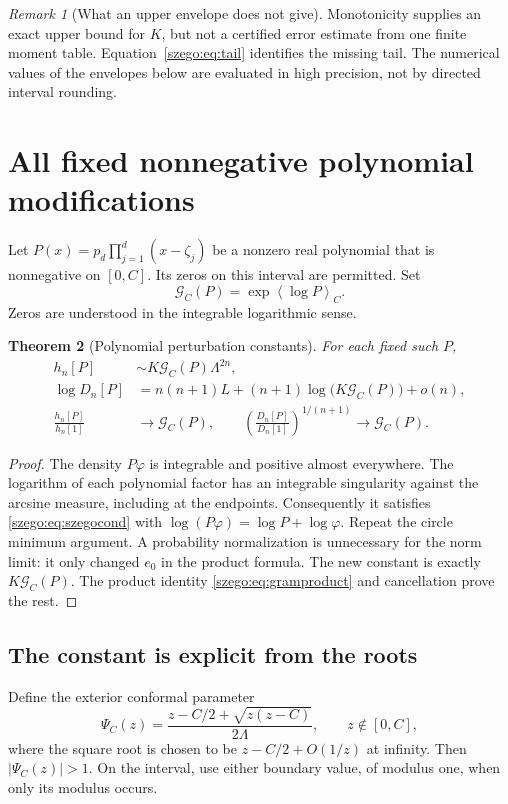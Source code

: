 \documentclass[11pt,a4paper]{article}
\numberwithin{equation}{section}
\newtheorem{theorem}{Theorem}[section]
\theoremstyle{remark}\newtheorem{remark}[theorem]{Remark}
\newcommand{\Lam}{\Lambda}
\newcommand{\mean}[1]{\left\langle#1\right\rangle}
\begin{document}
\begin{remark}[What an upper envelope does not give]
Monotonicity supplies an exact upper bound for $K$, but not a certified
error estimate from one finite moment table. Equation~\eqref{szego:eq:tail}
identifies the missing tail. The numerical values of the envelopes below
are evaluated in high precision, not by directed interval rounding.
\end{remark}

\section{All fixed nonnegative polynomial modifications}
\label{szego:sec:polynomials}
Let $P(x)=p_d\prod_{j=1}^d(x-\zeta_j)$ be a nonzero real polynomial that is
nonnegative on $[0,C]$. Its zeros on this interval are permitted.
Set
\begin{equation}\label{szego:eq:GP}
 \mathcal G_C(P)=\exp\mean{\log P}_C.
\end{equation}
Zeros are understood in the integrable logarithmic sense.

\begin{theorem}[Polynomial perturbation constants]\label{szego:thm:polynomial}
For each fixed such $P$,
\begin{align}
 h_n[P]&\sim K\mathcal G_C(P)\Lam^{2n},\label{szego:eq:polyh}\\
 \log D_n[P]&=n(n+1)L+(n+1)\log\bigl(K\mathcal G_C(P)\bigr)+o(n),\label{szego:eq:polyD}\\
 \frac{h_n[P]}{h_n[1]}&\longrightarrow\mathcal G_C(P),\qquad
 \left(\frac{D_n[P]}{D_n[1]}\right)^{1/(n+1)}
 \longrightarrow\mathcal G_C(P).\label{szego:eq:polyratio}
\end{align}
\end{theorem}
\begin{proof}
The density $P\varphi$ is integrable and positive almost everywhere.
The logarithm of each polynomial factor has an integrable singularity
against the arcsine measure, including at the endpoints. Consequently it
satisfies \eqref{szego:eq:szegocond} with $\log(P\varphi)=\log P+\log\varphi$.
Repeat the circle minimum argument. A probability normalization is
unnecessary for the norm limit: it only changed $e_0$ in the product
formula. The new constant is exactly $K\mathcal G_C(P)$.
The product identity \eqref{szego:eq:gramproduct} and cancellation prove the rest.
\end{proof}

\subsection{The constant is explicit from the roots}
Define the exterior conformal parameter
\begin{equation}\label{szego:eq:conformal}
 \Psi_C(z)=\frac{z-C/2+\sqrt{z(z-C)}}{2\Lam},\qquad z\notin[0,C],
\end{equation}
where the square root is chosen to be $z-C/2+O(1/z)$ at infinity.
Then $|\Psi_C(z)|>1$. On the interval, use either boundary value, of modulus
one, when only its modulus occurs.
\end{document}
